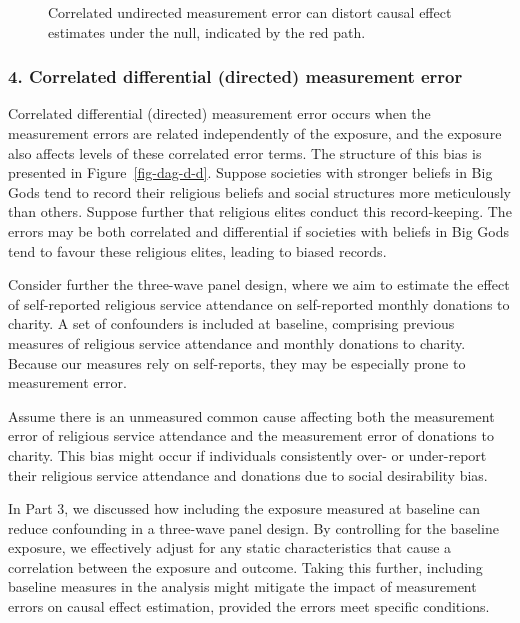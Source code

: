 \documentclass[
  singlecolumn,
  9pt]{article}
\begin{document}
\begin{figure}


\caption{\label{fig-dag-dep-u-effect}Correlated undirected measurement
error can distort causal effect estimates under the null, indicated by
the red path.}

\end{figure}%

\subsubsection{4. Correlated differential (directed) measurement
error}\label{correlated-differential-directed-measurement-error}

Correlated differential (directed) measurement error occurs when the
measurement errors are related independently of the exposure, and the
exposure also affects levels of these correlated error terms. The
structure of this bias is presented in Figure~\ref{fig-dag-d-d}. Suppose
societies with stronger beliefs in Big Gods tend to record their
religious beliefs and social structures more meticulously than others.
Suppose further that religious elites conduct this record-keeping. The
errors may be both correlated and differential if societies with beliefs
in Big Gods tend to favour these religious elites, leading to biased
records.

Consider further the three-wave panel design, where we aim to estimate
the effect of self-reported religious service attendance on
self-reported monthly donations to charity. A set of confounders is
included at baseline, comprising previous measures of religious service
attendance and monthly donations to charity. Because our measures rely
on self-reports, they may be especially prone to measurement error.

Assume there is an unmeasured common cause affecting both the
measurement error of religious service attendance and the measurement
error of donations to charity. This bias might occur if individuals
consistently over- or under-report their religious service attendance
and donations due to social desirability bias.

In Part 3, we discussed how including the exposure measured at baseline
can reduce confounding in a three-wave panel design. By controlling for
the baseline exposure, we effectively adjust for any static
characteristics that cause a correlation between the exposure and
outcome. Taking this further, including baseline measures in the
analysis might mitigate the impact of measurement errors on causal
effect estimation, provided the errors meet specific conditions.
\end{document}
